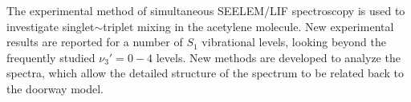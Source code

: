 



The experimental method of simultaneous SEELEM/LIF spectroscopy is
used to investigate singlet$\sim$triplet mixing in the acetylene
molecule.  New experimental results are reported for a number of $S_1$
vibrational levels, looking beyond the frequently studied $\nu_3'=0-4$
levels.  New methods are developed to analyze the spectra, which allow
the detailed structure of the spectrum to be related back to the
doorway model.

